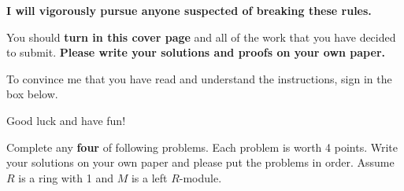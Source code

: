 \documentclass[11pt]{scrartcl}
\theoremstyle{definition}
\begin{document}
\begin{center}
\textbf{I will vigorously pursue anyone suspected of breaking these rules.}
\end{center}

\bigskip

You should \textbf{turn in this cover page} and all of the work that you have decided to submit. \textbf{Please write your solutions and proofs on your own paper.}

\bigskip

To convince me that you have read and understand the instructions, sign in the box below.

\bigskip


\bigskip

Good luck and have fun!

\newpage

Complete any \textbf{four} of following problems.  Each problem is worth 4 points. Write your solutions on your own paper and please put the problems in order.  Assume $R$ is a ring with 1 and $M$ is a left $R$-module.
\end{document}
